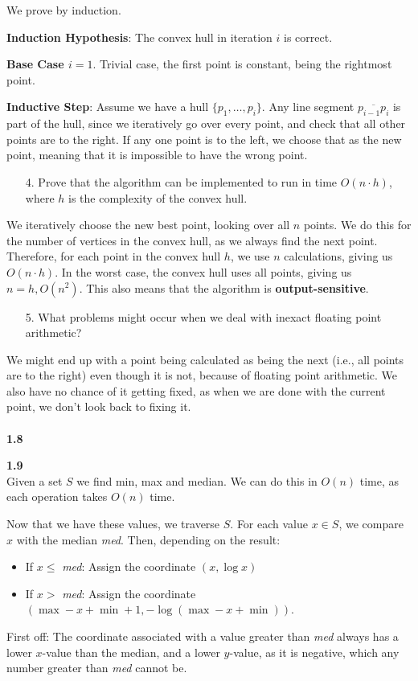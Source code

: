 We prove by induction.

\textbf{Induction Hypothesis}: The convex hull in iteration $i$ is correct.

\textbf{Base Case $i = 1$}. Trivial case, the first point is constant, being the rightmost point.

\textbf{Inductive Step}: Assume we have a hull $\{p_{1}, \ldots, p_{i}\}$. Any line segment $\overline{p_{i-1}p_i}$ is part of the hull, since we iteratively go over every point, and check that all other points are to the right. If any one point is to the left, we choose that as the new point, meaning that it is impossible to have the wrong point.

\begin{enumerate}
	\item[4.] Prove that the algorithm can be implemented to run in time $O(n \cdot h)$, where $h$ is the complexity of the convex hull.
\end{enumerate}

We iteratively choose the new best point, looking over all $n$ points. We do this for the number of vertices in the convex hull, as we always find the next point. Therefore, for each point in the convex hull $h$, we use $n$ calculations, giving us $O(n \cdot h)$. In the worst case, the convex hull uses all points, giving us $n = h, O(n^2)$. This also means that the algorithm is \textbf{output-sensitive}.

\begin{enumerate}
	\item[5.] What problems might occur when we deal with inexact floating point arithmetic?
\end{enumerate}

We might end up with a point being calculated as being the next (i.e., all points are to the right) even though it is not, because of floating point arithmetic. We also have no chance of it getting fixed, as when we are done with the current point, we don't look back to fixing it.
\\\\
\noindent
\textbf{1.8}\\
\noindent


\noindent
\textbf{1.9}\\
\noindent
Given a set $S$ we find min, max and median. We can do this in $O(n)$ time, as each operation takes $O(n)$ time.

Now that we have these values, we traverse $S$. For each value $x \in S$, we compare $x$ with the median \textit{med}. Then, depending on the result:
\begin{itemize}
	\item If $x \le $ \textit{med}: Assign the coordinate $(x,\log x)$
	\item If $x > $ \textit{med}: Assign the coordinate $(\max - x + \min + 1, - \log (\max - x + \min))$.
\end{itemize}
First off: The coordinate associated with a value greater than \textit{med} always has a lower $x$-value than the median, and a lower $y$-value, as it is negative, which any number greater than \textit{med} cannot be.

